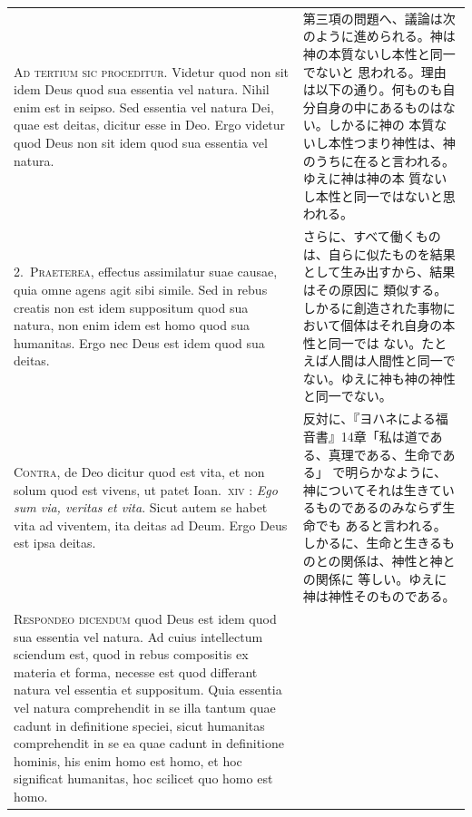 \documentclass[paper=a4paper,fontsize=10pt,jafontsize=9pt,titlepage]{jlreq}
\begin{document}
\begin{longtable}{p{21em}p{21em}}


\textsc{Ad tertium sic proceditur}. Videtur quod non sit idem Deus quod sua
 essentia vel natura. Nihil enim est in seipso. Sed essentia vel natura
 Dei, quae est deitas, dicitur esse in Deo. Ergo videtur quod Deus non
 sit idem quod sua essentia vel natura.


&

第三項の問題へ、議論は次のように進められる。神は神の本質ないし本性と同一でないと
 思われる。理由は以下の通り。何ものも自分自身の中にあるものはない。しかるに神の
 本質ないし本性つまり神性は、神のうちに在ると言われる。ゆえに神は神の本
 質ないし本性と同一ではないと思われる。

\\

2.~\textsc{Praeterea}, effectus assimilatur suae causae, quia omne agens
 agit sibi simile. Sed in rebus creatis non est idem suppositum quod sua
 natura, non enim idem est homo quod sua humanitas. Ergo nec Deus est
 idem quod sua deitas.

&

さらに、すべて働くものは、自らに似たものを結果として生み出すから、結果はその原因に
 類似する。しかるに創造された事物において個体はそれ自身の本性と同一では
 ない。たとえば人間は人間性と同一でない。ゆえに神も神の神性と同一でない。

\\


\textsc{Contra}, de Deo dicitur quod est vita, et non solum quod est
 vivens, ut patet Ioan.~\textsc{xiv} : \textit{Ego sum via, veritas et
 vita}. Sicut autem se habet vita ad viventem, ita deitas ad Deum. Ergo
 Deus est ipsa deitas.

&

反対に、『ヨハネによる福音書』14章「私は道である、真理である、生命である」
 で明らかなように、神についてそれは生きているものであるのみならず生命でも
 あると言われる。しかるに、生命と生きるものとの関係は、神性と神との関係に
 等しい。ゆえに神は神性そのものである。

\\



\textsc{Respondeo dicendum} quod Deus est idem quod sua essentia vel natura.
Ad cuius intellectum sciendum est, quod in rebus compositis ex materia et forma, necesse est quod differant natura vel essentia et suppositum.
Quia essentia vel natura comprehendit in se illa tantum quae cadunt in
 definitione speciei, sicut humanitas comprehendit in se ea quae cadunt
 in definitione hominis, his enim homo est homo, et hoc significat
 humanitas, hoc scilicet quo homo est homo.


\end{longtable}
\end{document}
